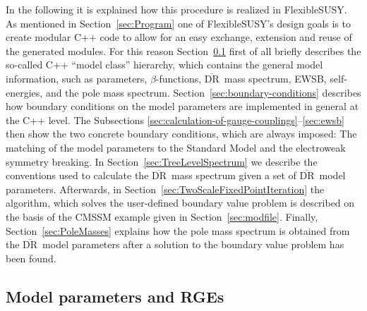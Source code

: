 \documentclass[final,3p,11pt,pdflatex]{elsarticle}
\makeatletter
\newcommand{\fs}{FlexibleSUSY\@\xspace}
\newcommand{\textoverline}[1]{$\overline{\mbox{#1}}$}
\newcommand{\DRbar}{\textoverline{DR}\xspace}
\newcommand{\secref}[1]{Section~\ref{#1}}
\makeatother
\begin{document}
In the following it is explained how this procedure is realized in
\fs.  As mentioned in \secref{sec:Program} one of \fs's design goals
is to create modular C++ code to allow for an easy exchange, extension
and reuse of the generated modules.  For this reason
\secref{sec:ModelParametersAndRGEs} first of all briefly describes the
so-called C++ ``model class'' hierarchy, which contains the general
model information, such as parameters, $\beta$-functions, \DRbar\ mass
spectrum, EWSB, self-energies, and the pole mass spectrum.
%
\secref{sec:boundary-conditions} describes how boundary conditions on
the model parameters are implemented in general at the C++ level.  The
Subsections \ref{sec:calculation-of-gauge-couplings}--\ref{sec:ewsb}
then show the two concrete boundary conditions, which are always
imposed: The matching of the model parameters to the Standard Model
and the electroweak symmetry breaking.
%
In \secref{sec:TreeLevelSpectrum} we describe the conventions used to
calculate the \DRbar\ mass spectrum given a set of \DRbar\ model
parameters.
%
Afterwards, in \secref{sec:TwoScaleFixedPointIteration} the algorithm,
which solves the user-defined boundary value problem is described on
the basis of the CMSSM example given in \secref{sec:modfile}.
%
Finally, \secref{sec:PoleMasses} explains how the pole mass spectrum
is obtained from the \DRbar\ model parameters after a solution to the
boundary value problem has been found.

\subsection{Model parameters and RGEs}
\label{sec:ModelParametersAndRGEs}
\end{document}
